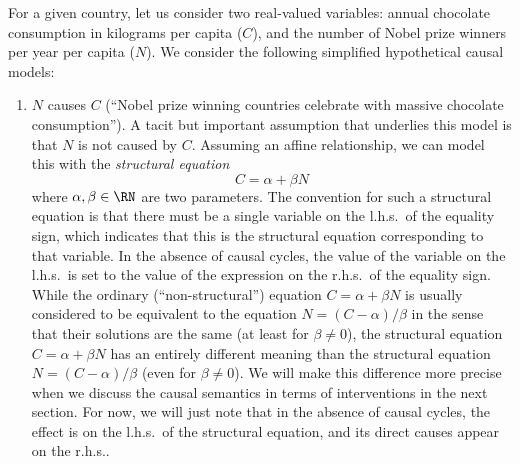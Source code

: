 For a given country, let us consider two real-valued variables: annual chocolate consumption in kilograms per capita ($C$), and the number of Nobel prize winners per year per capita ($N$). We consider the following simplified hypothetical causal models:
\begin{enumerate}[label=(\roman*)]
  \item $N$ causes $C$ (``Nobel prize winning countries celebrate with massive chocolate consumption''). 
    A tacit but important assumption that underlies this model is that $N$ is not caused by $C$. 
    Assuming an affine relationship, we can model this with the \emph{structural equation}
    \begin{equation}\label{eq:scm_N_causes_C}
    C = \alpha + \beta N
    \end{equation}
    where $\alpha, \beta \in \RN$ are two parameters.
    The convention for such a structural equation is that there must be a single variable on the l.h.s.\ of the equality sign, which indicates that this is the structural equation corresponding to that variable. In the absence of causal cycles,
    the value of the variable on the l.h.s.\ is set to the value of the expression on the r.h.s.\ of the equality sign.
    While the ordinary (``non-structural'') equation $C = \alpha + \beta N$ is usually considered to be equivalent to the equation $N = (C - \alpha) / \beta$ in the sense that their solutions are the same (at least for $\beta \ne 0$), the structural equation $C = \alpha + \beta N$ has an entirely different meaning than the structural equation $N = (C - \alpha) / \beta$ (even for $\beta \ne 0$).
    We will make this difference more precise when we discuss the causal semantics in terms of interventions in the next section.
    For now, we will just note that in the absence of causal cycles, the effect is on the l.h.s.\ of the structural equation, and its direct causes appear on the r.h.s..


\end{enumerate}

